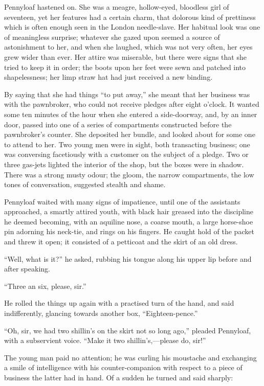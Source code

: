 Pennyloaf hastened on. She was a meagre,
{\protect\hypertarget{175}{}{}}hollow-eyed, bloodless girl of seventeen,
yet her features had a certain charm, that dolorous kind of prettiness
which is often enough seen in the London needle-slave. Her habitual look
was one of meaningless surprise; whatever she gazed upon seemed a source
of astonishment to her, and when she laughed, which was not very often,
her eyes grew wider than ever. Her attire was miserable, but there were
signs that she tried to keep it in order; the boots upon her feet were
sewn and patched into shapelessness; her limp straw hat had just
received a new binding.

By saying that she had things ``to put away,'' she meant that her
business was with the pawnbroker, who could not receive pledges after
eight o'clock. It wanted some ten minutes of the hour when she entered a
side-doorway, and, by an inner door, passed into one of a series of
compartments constructed before the pawnbroker's counter. She deposited
her bundle, and looked about for some one to attend to her. Two young
men were in sight, both transacting business;
{\protect\hypertarget{176}{}{}}one was conversing facetiously with a
customer on the subject of a pledge. Two or three gas-jets lighted the
interior of the shop, but the boxes were in shadow. There was a strong
musty odour; the gloom, the narrow compartments, the low tones of
conversation, suggested stealth and shame.

Pennyloaf waited with many signs of impatience, until one of the
assistants approached, a smartly attired youth, with black hair greased
into the discipline he deemed becoming, with an aquiline nose, a coarse
mouth, a large horse-shoe pin adorning his neck-tie, and rings on his
fingers. He caught hold of the packet and threw it open; it consisted of
a petticoat and the skirt of an old dress.

``Well, what is it?'' he asked, rubbing his tongue along his upper lip
before and after speaking.

``Three an six, please, sir.''

He rolled the things up again with a practised turn of the hand, and
said indifferently, glancing towards another box, ``Eighteen-pence.''

{\protect\hypertarget{177}{}{}}``Oh, sir, we had two shillin's on the
skirt not so long ago,'' pleaded Pennyloaf, with a subservient voice.
``Make it two shillin's,---please do, sir!''

The young man paid no attention; he was curling his moustache and
exchanging a smile of intelligence with his counter-companion with
respect to a piece of business the latter had in hand. Of a sudden he
turned and said sharply:

